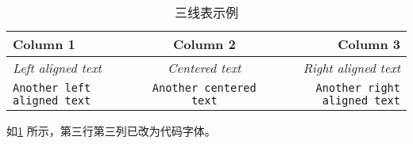\documentclass{article}
\begin{document}
\begin{table}[h]
    \centering
    \begin{tabular}{l c r}
        \toprule
        \textbf{Column 1}                  & \textbf{Column 2}              & \textbf{Column 3}                   \\
        \midrule
        \textit{Left aligned text}         & \textit{Centered text}         & \textit{Right aligned text}         \\
        \texttt{Another left aligned text} & \texttt{Another centered text} & \texttt{Another right aligned text} \\
        \bottomrule
    \end{tabular}
    \caption{三线表示例}
    \label{tab:my_table}
\end{table}

如\ref{tab:my_table} 所示，第三行第三列已改为代码字体。
\end{document}
